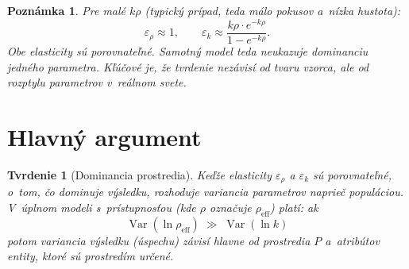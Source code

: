 \documentclass[12pt,a4paper]{article}
\newtheorem{proposition}{Tvrdenie}[section]
\newtheorem{remark}{Poznámka}[section]
\begin{document}
\begin{remark}
Pre malé $k\rho$ (typický prípad, teda málo pokusov a~nízka hustota):
\begin{equation}
    \varepsilon_\rho \approx 1, \qquad \varepsilon_k \approx \frac{k\rho \cdot e^{-k\rho}}{1 - e^{-k\rho}}.
\end{equation}
Obe elasticity sú porovnateľné. Samotný model teda neukazuje dominanciu jedného parametra. Kľúčové je, že tvrdenie nezávisí od tvaru vzorca, ale od \emph{rozptylu parametrov v~reálnom svete}.
\end{remark}

\section{Hlavný argument}

\begin{proposition}[Dominancia prostredia]\label{prop:dominancia}
Keďže elasticity $\varepsilon_\rho$ a $\varepsilon_k$ sú porovnateľné, o~tom, čo dominuje výsledku, rozhoduje variancia parametrov naprieč populáciou. V~úplnom modeli s~prístupnosťou (kde $\rho$ označuje $\rho_{\text{eff}}$) platí: ak
\begin{equation}\label{eq:hlavny}
    \boxed{\;\operatorname{Var}(\ln \rho_{\text{eff}}) \;\gg\; \operatorname{Var}(\ln k)\;}
\end{equation}
potom variancia výsledku (úspechu) závisí hlavne od prostredia $P$ a~atribútov entity, ktoré sú prostredím určené.
\end{proposition}
\end{document}

